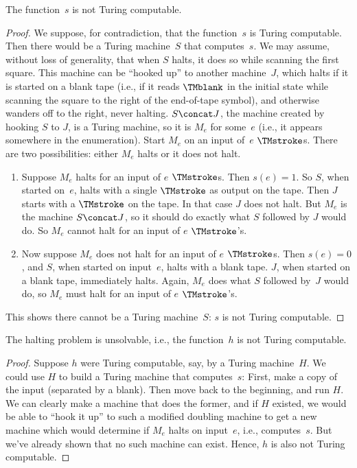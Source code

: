 \documentclass[../../../include/open-logic-section]{subfiles}
\begin{document}
\begin{lem}
The function~$s$ is not Turing computable.
\end{lem}

\begin{proof}
We suppose, for contradiction, that the function~$s$ is
Turing computable.  Then there would be a Turing machine~$S$ that
computes~$s$. We may assume, without loss of generality, that when $S$
halts, it does so while scanning the first square.  This machine can
be ``hooked up'' to another machine~$J$, which halts if it is started on a
blank tape (i.e., if it reads $\TMblank$ in the initial state while
scanning the square to the right of the end-of-tape symbol), and
otherwise wanders off to the right, never halting. $S \concat J$, the
machine created by hooking $S$ to $J$, is a Turing machine, so it is
$M_e$ for some~$e$ (i.e., it appears somewhere in the enumeration). Start $M_e$
on an input of~$e$ $\TMstroke$s. There are two possibilities: either
$M_e$ halts or it does not halt.
\begin{enumerate}
\item Suppose $M_e$ halts for an input of $e$ $\TMstroke$s. Then $s(e)
  = 1$. So $S$, when started on~$e$, halts with a single $\TMstroke$
  as output on the tape.  Then $J$ starts with a $\TMstroke$ on the
  tape. In that case $J$ does not halt. But $M_e$ is the machine $S
  \concat J$, so it should do exactly what $S$ followed by $J$ would
  do.  So $M_e$ cannot halt for an input of $e$ $\TMstroke$'s.

\item Now suppose $M_e$ does not halt for an input of $e$
  $\TMstroke$s.  Then $s(e) = 0$, and $S$, when started on input~$e$,
  halts with a blank tape.  $J$, when started on a blank tape,
  immediately halts.  Again, $M_e$ does what $S$ followed by~$J$ would
  do, so $M_e$ must halt for an input of $e$ $\TMstroke$'s.
\end{enumerate}
This shows there cannot be a Turing machine~$S$: $s$ is not Turing
computable.
\end{proof}

\begin{thm}
 The halting problem is unsolvable, i.e.,
the function~$h$ is not Turing computable.
\end{thm}

\begin{proof}
Suppose $h$ were Turing computable, say, by a Turing machine~$H$.
We could use $H$ to build a Turing machine that computes~$s$: First,
make a copy of the input (separated by a blank). Then move back to the
beginning, and run $H$.  We can clearly make a machine that does the
former, and if $H$ existed, we would be able to ``hook it up'' to such
a modified doubling machine to get a new machine which would determine
if $M_e$ halts on input~$e$, i.e., computes~$s$. But we've already
shown that no such machine can exist. Hence, $h$ is also not Turing
computable.
\end{proof}
\end{document}
